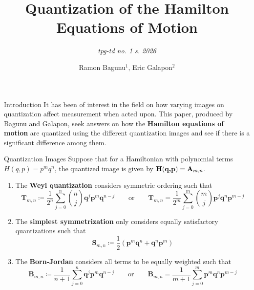 \documentclass[aspectratio=169]{beamer}
\title{Quantization of the Hamilton Equations of Motion}
\subtitle[]{\textit{tpg-td no. 1 s. 2026}}
\author[Bagunu, Galapon]{Ramon Bagunu$^1$, Eric Galapon$^2$}
\institute[]{\inst{1}University of the Philippines Manila\and\inst{2}University of the Philippines Diliman}
\begin{document}
	\maketitle
	\begin{frame}{Introduction}
		It has been of interest in the field on how varying images on quantization affect measurement when acted upon. This paper, produced by Bagunu and Galapon, seek answers on how the \textbf{Hamilton equations of motion} are quantized using the different quantization images and see if there is a significant difference among them.
	\end{frame}
	\begin{frame}{Quantization Images}
		Suppose that for a Hamiltonian with polynomial terms $H(q,p)=p^mq^n$, the quantized image is given by $\textbf{H}(\textbf{q,\textbf{p}})=\textbf{A}_{m,n}$. 
		\begin{enumerate}
			\item The \textbf{Weyl quantization} considers symmetric ordering such that
			{\footnotesize\begin{equation}\label{eqn:weyl}
				\textbf{T}_{m,n}\coloneqq\frac{1}{2^n}\sum_{j=0}^n\binom{n}{j}\textbf{q}^j\textbf{p}^m\textbf{q}^{n-j}\qquad\text{or}\qquad\textbf{T}_{m,n}=\frac{1}{2^m}\sum_{j=0}^m\binom{m}{j}\textbf{p}^j\textbf{q}^n\textbf{p}^{m-j}
			\end{equation}}
			\item The \textbf{simplest symmetrization} only considers equally satisfactory quantizations such that
			{\footnotesize\begin{equation}\label{eqn:ss}
				\textbf{S}_{m,n}\coloneqq\frac{1}{2}(\textbf{p}^m\textbf{q}^n+\textbf{q}^n\textbf{p}^m)
			\end{equation}}
			\item The \textbf{Born-Jordan} considers all terms to be equally weighted such that
			{\footnotesize\begin{equation}\label{eqn:bj}
				\textbf{B}_{m,n}\coloneqq\frac{1}{n+1}\sum_{j=0}^n\textbf{q}^j\textbf{p}^m\textbf{q}^{n-j}\qquad\text{or}\qquad\textbf{B}_{m,n}=\frac{1}{m+1}\sum_{j=0}^m\textbf{p}^m\textbf{q}^n\textbf{p}^{m-j}
			\end{equation}}
		\end{enumerate}
	\end{frame}
\end{document}
